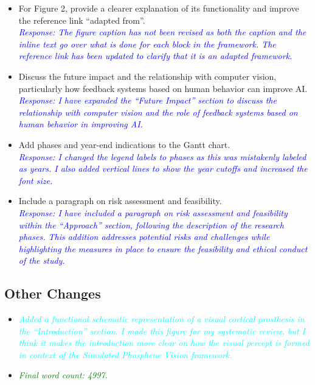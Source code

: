 \documentclass[10pt]{article}
\begin{document}
\begin{itemize}
  \item For Figure 2, provide a clearer explanation of its functionality and improve the reference link “adapted from”.\\
        \textcolor{blue}{\textit{Response: The figure caption has not been
            revised as both the caption and the inline text go over what is done for
            each block in the framework. The reference link has been updated to
            clarify that it is an adapted framework.}}

  \item Discuss the future impact and the relationship with computer vision, particularly how feedback systems based on human behavior can improve AI.\\
        \textcolor{blue}{\textit{Response: I have expanded the ``Future Impact'' section to discuss the relationship with computer vision and the role of feedback systems based on human behavior in improving AI.}}

  \item Add phases and year-end indications to the Gantt chart.\\
        \textcolor{blue}{\textit{Response: I changed the legend labels to phases
            as this was mistakenly labeled as years. I also added vertical lines
            to show the year cutoffs and increased the font size.}}

  \item Include a paragraph on risk assessment and feasibility.\\
        \textcolor{blue}{\textit{Response: I have included a paragraph on risk assessment and feasibility within the ``Approach'' section, following the description of the research phases. This addition addresses potential risks and challenges while highlighting the measures in place to ensure the feasibility and ethical conduct of the study.}}
\end{itemize}

\subsection*{Other Changes}
\begin{itemize}
  \item \textcolor{cyan}{\textit{Added a functional schematic representation of
            a visual cortical prosthesis in the ``Introduction'' section. I made this
            figure for my systematic review, but I think it makes the introduction more
            clear on how the visual percept is formed in context of the Simulated
            Phosphene Vision framework.}}
  \item \textcolor{green}{\textit{Final word count: 4997.}}
\end{itemize}
\end{document}
